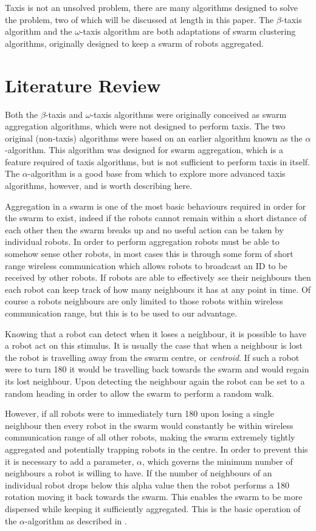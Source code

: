 \documentclass[conference]{IEEEtran}
\begin{document}
Taxis is not an unsolved problem, there are many algorithms designed to solve the problem, two of which will be discussed at length in this paper. The $\beta$-taxis algorithm and the $\omega$-taxis algorithm are both adaptations of swarm clustering algorithms, originally designed to keep a swarm of robots aggregated.

\section{Literature Review}
Both the $\beta$-taxis and $\omega$-taxis algorithms were originally conceived as swarm aggregation algorithms, which were not designed to perform taxis. The two original (non-taxis) algorithms were based on an earlier algorithm known as the $\alpha$-algorithm. This algorithm was designed for swarm aggregation, which is a feature required of taxis algorithms, but is not sufficient to perform taxis in itself. The $\alpha$-algorithm is a good base from which to explore more advanced taxis algorithms, however, and is worth describing here.

Aggregation in a swarm is one of the most basic behaviours required in order for the swarm to exist, indeed if the robots cannot remain within a short distance of each other then the swarm breaks up and no useful action can be taken by individual robots. In order to perform aggregation robots must be able to somehow sense other robots, in most cases this is through some form of short range wireless communication which allows robots to broadcast an ID to be received by other robots. If robots are able to effectively \textit{see} their neighbours then each robot can keep track of how many neighbours it has at any point in time. Of course a robots neighbours are only limited to those robots within wireless communication range, but this is to be used to our advantage.

Knowing that a robot can detect when it loses a neighbour, it is possible to have a robot act on this stimulus. It is usually the case that when a neighbour is lost the robot is travelling away from the swarm centre, or \textit{centroid}. If such a robot were to turn 180\degree{} it would be travelling back towards the swarm and would regain its lost neighbour. Upon detecting the neighbour again the robot can be set to a random heading in order to allow the swarm to perform a random walk.

However, if all robots were to immediately turn 180\degree{} upon losing a single neighbour then every robot in the swarm would constantly be within wireless communication range of all other robots, making the swarm extremely tightly aggregated and potentially trapping robots in the centre. In order to prevent this it is necessary to add a parameter, $\alpha$, which governs the minimum number of neighbours a robot is willing to have. If the number of neighbours of an individual robot drops below this alpha value then the robot performs a 180\degree{} rotation moving it back towards the swarm. This enables the swarm to be more dispersed while keeping it sufficiently aggregated. This is the basic operation of the $\alpha$-algorithm as described in \cite{bjerknes_analysis_2007}.
\end{document}
